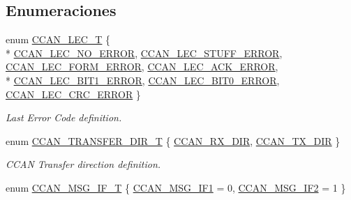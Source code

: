 \subsection*{Enumeraciones}
\begin{DoxyCompactItemize}
\item 
enum \hyperlink{group___c_c_a_n__18_x_x__43_x_x_gad7a3e9e736dfb04f5faff4954a01591a}{C\+C\+A\+N\+\_\+\+L\+E\+C\+\_\+T} \{ \\*
\hyperlink{group___c_c_a_n__18_x_x__43_x_x_ggad7a3e9e736dfb04f5faff4954a01591aa0f85936863162c77305b1561506af2e4}{C\+C\+A\+N\+\_\+\+L\+E\+C\+\_\+\+N\+O\+\_\+\+E\+R\+R\+OR}, 
\hyperlink{group___c_c_a_n__18_x_x__43_x_x_ggad7a3e9e736dfb04f5faff4954a01591aa0f2bbf091c125bc5a3800089ce41d32f}{C\+C\+A\+N\+\_\+\+L\+E\+C\+\_\+\+S\+T\+U\+F\+F\+\_\+\+E\+R\+R\+OR}, 
\hyperlink{group___c_c_a_n__18_x_x__43_x_x_ggad7a3e9e736dfb04f5faff4954a01591aac23e3d0c0180164aa01c8058e682d95a}{C\+C\+A\+N\+\_\+\+L\+E\+C\+\_\+\+F\+O\+R\+M\+\_\+\+E\+R\+R\+OR}, 
\hyperlink{group___c_c_a_n__18_x_x__43_x_x_ggad7a3e9e736dfb04f5faff4954a01591aaaa28041d8c7ea3816e20198e56a91449}{C\+C\+A\+N\+\_\+\+L\+E\+C\+\_\+\+A\+C\+K\+\_\+\+E\+R\+R\+OR}, 
\\*
\hyperlink{group___c_c_a_n__18_x_x__43_x_x_ggad7a3e9e736dfb04f5faff4954a01591aa064ab8e719bb679a9be161469a1ef085}{C\+C\+A\+N\+\_\+\+L\+E\+C\+\_\+\+B\+I\+T1\+\_\+\+E\+R\+R\+OR}, 
\hyperlink{group___c_c_a_n__18_x_x__43_x_x_ggad7a3e9e736dfb04f5faff4954a01591aa123dfabe703e6396a0334598bcae266e}{C\+C\+A\+N\+\_\+\+L\+E\+C\+\_\+\+B\+I\+T0\+\_\+\+E\+R\+R\+OR}, 
\hyperlink{group___c_c_a_n__18_x_x__43_x_x_ggad7a3e9e736dfb04f5faff4954a01591aa9b75109a2824295f6739961e1b110367}{C\+C\+A\+N\+\_\+\+L\+E\+C\+\_\+\+C\+R\+C\+\_\+\+E\+R\+R\+OR}
 \}\begin{DoxyCompactList}\small\item\em Last Error Code definition. \end{DoxyCompactList}
\item 
enum \hyperlink{group___c_c_a_n__18_x_x__43_x_x_gac400be6c4ae22b8b773b0bea6e9c5f02}{C\+C\+A\+N\+\_\+\+T\+R\+A\+N\+S\+F\+E\+R\+\_\+\+D\+I\+R\+\_\+T} \{ \hyperlink{group___c_c_a_n__18_x_x__43_x_x_ggac400be6c4ae22b8b773b0bea6e9c5f02a20cb141be8468d07983601deedd9f726}{C\+C\+A\+N\+\_\+\+R\+X\+\_\+\+D\+IR}, 
\hyperlink{group___c_c_a_n__18_x_x__43_x_x_ggac400be6c4ae22b8b773b0bea6e9c5f02a03c25f707e2e0857392c2def9e8cef20}{C\+C\+A\+N\+\_\+\+T\+X\+\_\+\+D\+IR}
 \}\begin{DoxyCompactList}\small\item\em C\+C\+AN Transfer direction definition. \end{DoxyCompactList}
\item 
enum \hyperlink{group___c_c_a_n__18_x_x__43_x_x_gac90da0138c430750d2d7d55d4448cae7}{C\+C\+A\+N\+\_\+\+M\+S\+G\+\_\+\+I\+F\+\_\+T} \{ \hyperlink{group___c_c_a_n__18_x_x__43_x_x_ggac90da0138c430750d2d7d55d4448cae7aa0eb1a2b0eac4bdb8a9c8dba09d42b26}{C\+C\+A\+N\+\_\+\+M\+S\+G\+\_\+\+I\+F1} = 0, 
\hyperlink{group___c_c_a_n__18_x_x__43_x_x_ggac90da0138c430750d2d7d55d4448cae7a45267f491cc7247be1a624489ce31c2c}{C\+C\+A\+N\+\_\+\+M\+S\+G\+\_\+\+I\+F2} = 1
 \}
\end{DoxyCompactItemize}
